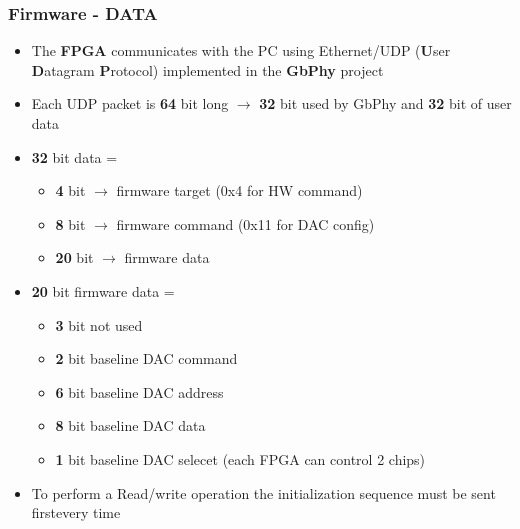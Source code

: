 \documentclass[aspectratio=169]{beamer}
\begin{document}
	\begin{frame}
	\frametitle{Firmware - DATA}
	\begin{itemize}
		\item The \textbf{FPGA} communicates with the PC using Ethernet/UDP (\textbf{U}ser \textbf{D}atagram \textbf{P}rotocol) implemented in the \textbf{GbPhy} project
		\item Each UDP packet is \textbf{64} bit long $\rightarrow$ \textbf{32} bit used by GbPhy and \textbf{32} bit of user data
		\item \textbf{32} bit data =
		\begin{itemize}
			\item \textbf{4} bit $\rightarrow$ firmware target (0x4 for HW command)
			\item \textbf{8} bit $\rightarrow$ firmware command (0x11 for DAC config)
			\item \textbf{20} bit $\rightarrow$ firmware data
		\end{itemize}
		\item \textbf{20} bit firmware data =
		\begin{itemize}
			\item \textbf{3} bit not used
			\item \textbf{2} bit baseline DAC command
			\item \textbf{6} bit baseline DAC address
			\item \textbf{8} bit baseline DAC data
			\item \textbf{1} bit baseline DAC selecet (each FPGA can control 2 chips)
		\end{itemize}
		\item To perform a Read/write operation the initialization sequence must be sent first\newline every time
	\end{itemize}
	\end{frame}
\end{document}
